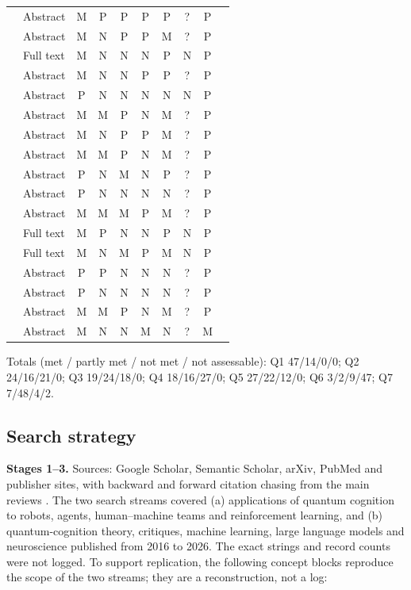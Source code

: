 \documentclass[10pt,a4paper]{article}
\begin{document}
\begin{longtable}{@{}P{5.2cm}P{1.6cm}cccccccc@{}}
\citet{Ried2019} & Abstract & M & P & P & P & P & ? & P \\
\citet{LopezIncera2020} & Abstract & M & N & P & P & M & ? & P \\
\citet{Yan2021a} & Full text & M & N & N & N & P & N & P \\
\citet{Yukalov2022} & Abstract & M & N & N & P & P & ? & P \\
\citet{Yukalov2023} & Abstract & P & N & N & N & N & N & P \\
\citet{Essalmi2025} & Abstract & M & M & P & N & M & ? & P \\
\citet{Kong2026} & Abstract & M & N & P & P & M & ? & P \\
\citet{Ashtiani2019} & Abstract & M & M & P & N & M & ? & P \\
\citet{Pushparaj2021} & Abstract & P & N & M & N & P & ? & P \\
\citet{Humr2023} & Abstract & P & N & N & N & N & ? & P \\
\citet{Roeder2023} & Abstract & M & M & M & P & M & ? & P \\
\citet{Humr2025} & Full text & M & P & N & N & P & N & P \\
\citet{vanderMeer2025} & Full text & M & N & M & P & M & N & P \\
\citet{Kak2018} & Abstract & P & P & N & N & N & ? & P \\
\citet{Hoorn2019} & Abstract & P & N & N & N & N & ? & P \\
\citet{Essalmi2026} & Abstract & M & M & P & N & M & ? & P \\
\citet{Nebli2026} & Abstract & M & N & N & M & N & ? & M \\
\end{longtable}
\noindent Totals (met / partly met / not met / not assessable): Q1 47/14/0/0; Q2 24/16/21/0; Q3 19/24/18/0; Q4 18/16/27/0; Q5 27/22/12/0; Q6 3/2/9/47; Q7 7/48/4/2.

\subsection*{Search strategy}
\noindent\textbf{Stages 1--3.} Sources: Google Scholar, Semantic Scholar, arXiv, PubMed and publisher sites, with backward and forward citation chasing from the main reviews \citep{Pothos2022,Huang2025b,Widdows2021,Meyer2022}. The two search streams covered (a) applications of quantum cognition to robots, agents, human--machine teams and reinforcement learning, and (b) quantum-cognition theory, critiques, machine learning, large language models and neuroscience published from 2016 to 2026. The exact strings and record counts were not logged. To support replication, the following concept blocks reproduce the scope of the two streams; they are a reconstruction, not a log:
\end{document}
